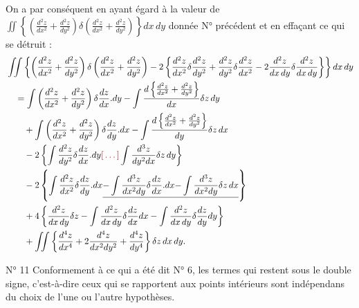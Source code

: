 \documentclass[11pt,a4paper]{article}
\begin{document}
On a par conséquent en ayant égard à la valeur de
$\iint \left\{ \left( \frac{d^{2}z}{dx^{2}} + \frac{d^{2}z}{dy^{2}} \right)
\delta\left( \frac{d^{2}z}{dx^{2}} + \frac{d^{2}z}{dy^{2}} \right) \right\}
dx\, dy$
donnée N° précédent et en effaçant ce qui se détruit :
\begin{align*}
  &\iint \left\{ \left( \frac{d^{2}z}{dx^{2}} + \frac{d^{2}z}{dy^{2}} \right)
     \delta\left( \frac{d^{2}z}{dx^{2}} + \frac{d^{2}z}{dy^{2}} \right)
   - 2\left\{ \frac{d^{2}z}{dx^{2}} \delta\frac{d^{2}z}{dy^{2}}
     + \frac{d^{2}z}{dy^{2}} \delta\frac{d^{2}z}{dx^{2}}
     - 2\frac{d^{2}z}{dx\,dy} \delta\frac{d^{2}z}{dx\,dy} \right\} \right\}
     dx\, dy \\
  &\quad = \int \left( \frac{d^{2}z}{dx^{2}} + \frac{d^{2}z}{dy^{2}} \right)
      \delta\frac{dz}{dx} . dy
   - \int \frac{d\left\{ \frac{d^{2}z}{dx^{2}} + \frac{d^{2}z}{dy^{2}} \right\}}{dx}
      \delta z\, dy \\
  &\qquad + \int \left( \frac{d^{2}z}{dx^{2}} + \frac{d^{2}z}{dy^{2}} \right)
      \delta\frac{dz}{dy} . dx
   - \int \frac{d\left\{ \frac{d^{2}z}{dx^{2}} + \frac{d^{2}z}{dy^{2}} \right\}}{dy}
      \delta z\, dx \\
  &\qquad - 2\left\{ \int \frac{d^{2}z}{dy^{2}} \delta\frac{dz}{dx} . dy
      \ill{} \int \frac{d^{3}z}{dy^{2}dx} \delta z\, dy \right\} \\
  &\qquad - 2\left\{ \int \frac{d^{2}z}{dx^{2}} \delta\frac{dz}{dy} . dx
      \struck{- \int \frac{d^{3}z}{dx^{2}dy} \delta\frac{dz}{dx} . dx}
      \struck{- \int \frac{d^{3}z}{dx^{2}dy} \delta z\, dx} \right\} \\
  &\qquad + 4\left\{ \frac{d^{2}z}{dx\,dy} \delta z
      - \int \frac{d^{2}z}{dx\,dy} \delta\frac{dz}{dx} dx
      - \int \frac{d^{2}z}{dx\,dy} \delta\frac{dz}{dy} dy \right\} \\
  &\qquad + \iint \left\{ \frac{d^{4}z}{dx^{4}}
      + 2\frac{d^{4}z}{dx^{2}dy^{2}} + \frac{d^{4}z}{dy^{4}} \right\}
      \delta z\, dx\, dy .
\end{align*}

N° 11 Conformement à ce qui a été dit N° 6, les termes qui restent sous le
double signe, c'est-à-dire ceux qui se rapportent aux points intérieurs sont
indépendans du choix de l'une ou l'autre hypothèses.
\end{document}
